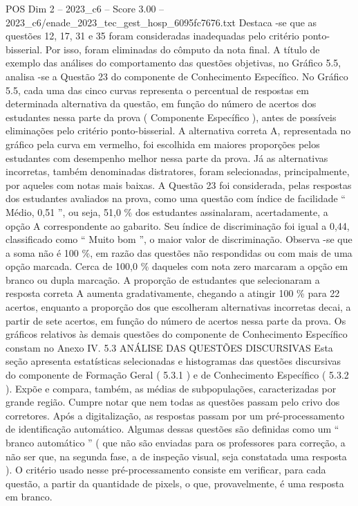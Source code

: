 \begin{textsample}{POS Dim 2 – 2023\_c6 – Score 3.00 – 2023\_c6/enade\_2023\_tec\_gest\_hosp\_6095fc7676.txt}
Destaca -se que as questões 12, 17, 31 e 35 foram consideradas inadequadas pelo critério ponto-bisserial.
Por isso, foram eliminadas do cômputo da nota final.
A título de exemplo das análises do comportamento das questões objetivas, no Gráfico 5.5, analisa -se a Questão 23 do componente de Conhecimento Específico.
No Gráfico 5.5, cada uma das cinco curvas representa o percentual de respostas em determinada alternativa da questão, em função do número de acertos dos estudantes nessa parte da prova ( Componente Específico ), antes de possíveis eliminações pelo critério ponto-bisserial.
A alternativa correta A, representada no gráfico pela curva em vermelho, foi escolhida em maiores proporções pelos estudantes com desempenho melhor nessa parte da prova.
Já as alternativas incorretas, também denominadas distratores, foram selecionadas, principalmente, por aqueles com notas mais baixas.
A Questão 23 foi considerada, pelas respostas dos estudantes avaliados na prova, como uma questão com índice de facilidade “ Médio, 0,51 ”, ou seja, 51,0 \% dos estudantes assinalaram, acertadamente, a opção A correspondente ao gabarito.
Seu índice de discriminação foi igual a 0,44, classificado como “ Muito bom ”, o maior valor de discriminação.
Observa -se que a soma não é 100 \%, em razão das questões não respondidas ou com mais de uma opção marcada.
Cerca de 100,0 \% daqueles com nota zero marcaram a opção em branco ou dupla marcação.
A proporção de estudantes que selecionaram a resposta correta A aumenta gradativamente, chegando a atingir 100 \% para 22 acertos, enquanto a proporção dos que escolheram alternativas incorretas decai, a partir de sete acertos, em função do número de acertos nessa parte da prova.
Os gráficos relativos às demais questões do componente de Conhecimento Específico constam no Anexo IV. 5.3 ANÁLISE DAS QUESTÕES DISCURSIVAS Esta seção apresenta estatísticas selecionadas e histogramas das questões discursivas do componente de Formação Geral ( 5.3.1 ) e de Conhecimento Específico ( 5.3.2 ).
Expõe e compara, também, as médias de subpopulações, caracterizadas por grande região.
Cumpre notar que nem todas as questões passam pelo crivo dos corretores.
Após a digitalização, as respostas passam por um pré-processamento de identificação automático.
Algumas dessas questões são definidas como um “ branco automático ” ( que não são enviadas para os professores para correção, a não ser que, na segunda fase, a de inspeção visual, seja constatada uma resposta ).
O critério usado nesse pré-processamento consiste em verificar, para cada questão, a partir da quantidade de pixels, o que, provavelmente, é uma resposta em branco.

\end{textsample}
